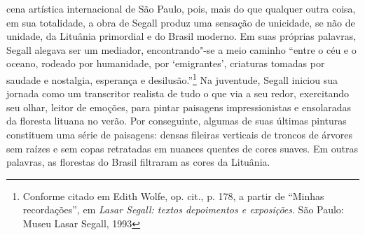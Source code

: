 cena artística internacional de São Paulo, pois, mais do que qualquer
outra coisa, em sua totalidade, a obra de Segall produz uma sensação de
unicidade, se não de unidade, da Lituânia primordial e do Brasil
moderno. Em suas próprias palavras, Segall alegava ser um mediador,
encontrando"-se a meio caminho ``entre o céu e o oceano, rodeado por
humanidade, por `emigrantes', criaturas tomadas por saudade e nostalgia,
esperança e desilusão.''\footnote{Conforme citado em Edith Wolfe, op. cit., p. 178, a partir de
  ``Minhas recordações'', em \textit{Lasar Segall: textos depoimentos e
  exposições}. São Paulo: Museu Lasar Segall, 1993} Na juventude,
Segall iniciou sua jornada como um transcritor realista de tudo o que
via a seu redor, exercitando seu olhar, leitor de emoções, para pintar
paisagens impressionistas e ensolaradas da floresta lituana no verão.
Por conseguinte, algumas de suas últimas pinturas constituem uma série
de paisagens: densas fileiras verticais de troncos de árvores sem raízes
e sem copas retratadas em nuances quentes de cores suaves. Em outras
palavras, as florestas do Brasil filtraram as cores da Lituânia.

